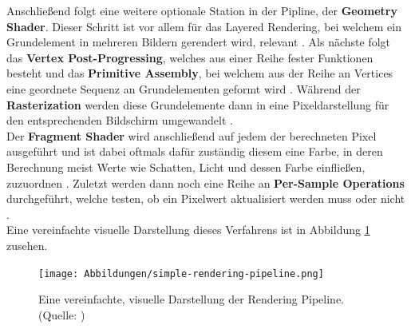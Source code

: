 Anschließend folgt eine weitere optionale Station in der Pipline, der \textbf{Geometry Shader}.  Dieser Schritt ist vor allem für das Layered Rendering, bei welchem ein Grundelement in mehreren Bildern gerendert wird, relevant \citep{khronos:geometry-shader}. 
Als nächste folgt das \textbf{Vertex Post-Progressing}, welches aus einer Reihe fester Funktionen besteht \citep{khronos:rendering-pipeline} und das \textbf{Primitive Assembly}, bei welchem aus der Reihe an Vertices eine geordnete Sequenz an Grundelementen geformt wird \citep{khronos:rendering-pipeline}. 
Während der \textbf{Rasterization} werden diese Grundelemente dann in eine Pixeldarstellung für den entsprechenden Bildschirm umgewandelt \citep{vries:learn-opengl-triangle}.\\
Der \textbf{Fragment Shader} wird anschließend auf jedem der berechneten Pixel ausgeführt und ist dabei oftmals dafür zuständig diesem eine Farbe, in deren Berechnung meist Werte wie Schatten, Licht und dessen Farbe einfließen, zuzuordnen \citep{vries:learn-opengl-triangle}.
Zuletzt werden dann noch eine Reihe an \textbf{Per-Sample Operations} durchgeführt, welche testen, ob ein Pixelwert aktualisiert werden muss oder nicht \citep{khronos:rendering-pipeline}.\\
Eine vereinfachte visuelle Darstellung dieses Verfahrens ist in Abbildung \ref{fig:visual-pipeline} zusehen.
\begin{figure}[h!]
\centering
\texttt{[image: Abbildungen/simple-rendering-pipeline.png]}
\caption[OpenGL: Vereinfachte, visuelle Darstellung der Rendering Pipline]{Eine vereinfachte, visuelle Darstellung der Rendering Pipeline. (Quelle: \citet{vries:learn-opengl-triangle})}
\label{fig:visual-pipeline}
\end{figure}





